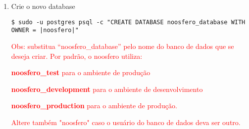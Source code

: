 \begin{enumerate}
\item Crie o novo database
\begin{lstlisting}[style=base]
$ sudo -u postgres psql -c "CREATE DATABASE noosfero_database WITH OWNER = |noosfero|"
\end{lstlisting}

\textcolor{red}{{\scriptsize Obs: substitua  “noosfero\_database” pelo nome do banco de dados que se deseja criar. Por padrão, o noosfero utiliza:}}

\textcolor{red}{{\scriptsize	\textbf{noosfero\_test} para o ambiente de produção}}

\textcolor{red}{{\scriptsize	\textbf{noosfero\_development} para o ambiente de desenvolvimento}}

\textcolor{red}{{\scriptsize	\textbf{noosfero\_production} para o ambiente de produção.}}

\textcolor{red}{{\scriptsize Altere também "noosfero"  caso o usuário do banco de dados deva ser outro. }}

\end{enumerate}